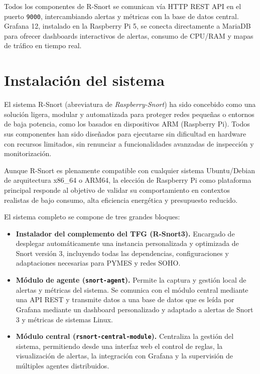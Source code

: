 \documentclass[11pt,a4paper,twoside]{report}
\begin{document}
Todos los componentes de R-Snort se comunican vía HTTP REST API en el puerto \texttt{9000}, intercambiando alertas y métricas con la base de datos central. Grafana 12, instalado en la Raspberry Pi 5, se conecta directamente a MariaDB para ofrecer dashboards interactivos de alertas, consumo de CPU/RAM y mapas de tráfico en tiempo real.

\section{Instalación del sistema}

El sistema R-Snort (abreviatura de \textit{Raspberry-Snort}) ha sido concebido como una solución ligera, modular y automatizada para proteger redes pequeñas o entornos de baja potencia, como los basados en dispositivos ARM (Raspberry Pi). Todos sus componentes han sido diseñados para ejecutarse sin dificultad en hardware con recursos limitados, sin renunciar a funcionalidades avanzadas de inspección y monitorización.\newline

Aunque R-Snort es plenamente compatible con cualquier sistema Ubuntu/Debian de arquitectura x86\_64 o ARM64, la elección de Raspberry Pi como plataforma principal responde al objetivo de validar su comportamiento en contextos realistas de bajo consumo, alta eficiencia energética y presupuesto reducido.\newline

El sistema completo se compone de tres grandes bloques:

\begin{itemize}
	\item \textbf{Instalador del complemento del TFG (R-Snort3).} Encargado de desplegar automáticamente una instancia personalizada y optimizada de Snort versión 3, incluyendo todas las dependencias, configuraciones y adaptaciones necesarias para PYMES y redes SOHO.
	
	\item \textbf{Módulo de agente (\texttt{snort-agent}).} Permite la captura y gestión local de alertas y métricas del sistema. Se comunica con el módulo central mediante una API REST y transmite datos a una base de datos que es leída por Grafana mediante un dashboard personalizado y adaptado a alertas de Snort 3 y métricas de sistemas Linux.
	
	\item \textbf{Módulo central (\texttt{rsnort-central-module}).} Centraliza la gestión del sistema, permitiendo desde una interfaz web el control de reglas, la visualización de alertas, la integración con Grafana y la supervisión de múltiples agentes distribuidos.
\end{itemize}
\end{document}

